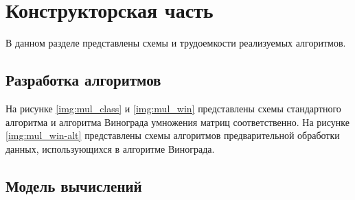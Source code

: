 \chapter{Конструкторская часть}

В данном разделе представлены схемы и трудоемкости реализуемых алгоритмов.

\section{Разработка алгоритмов}

На рисунке \ref{img:mul_class} и \ref{img:mul_win} представлены схемы стандартного алгоритма и алгоритма Винограда умножения матриц соответственно.
На рисунке \ref{img:mul_win-alt} представлены схемы алгоритмов предварительной обработки данных, использующихся в алгоритме Винограда.

\clearpage
{}
\clearpage
{}
\clearpage

\section{Модель вычислений}

